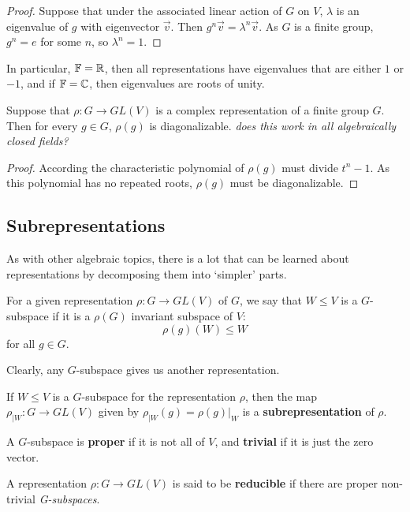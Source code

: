 \documentclass[a4paper]{article}
\begin{document}
\begin{proof}
    Suppose that under the associated linear action of $G$ on $V$, $\lambda$ is an eigenvalue of $g$ with eigenvector $\vec{v}$. Then $g^n\vec{v} = \lambda^n \vec{v}$. As $G$ is a finite group, $g^n = e$ for some $n$, so $\lambda^n = 1$.
\end{proof}
In particular, $\mathbb{F} = \mathbb{R}$, then all representations have eigenvalues that are either $1$ or $-1$, and if $\mathbb{F} = \mathbb{C}$, then eigenvalues are roots of unity.

\begin{cor}
    Suppose that $\rho : G \to GL(V)$ is a complex representation of a finite group $G$. Then for every $g \in G$, $\rho(g)$ is diagonalizable. \textit{does this work in all algebraically closed fields?} 
\end{cor} 

\begin{proof}
    According the characteristic polynomial of $\rho(g)$ must divide $t^n - 1$. As this polynomial has no repeated roots, $\rho(g)$ must be diagonalizable.
\end{proof}

\subsection{Subrepresentations}
As with other algebraic topics, there is a lot that can be learned about representations by decomposing them into `simpler' parts.

\begin{defi}[G-subspace]
    For a given representation $\rho: G \to GL(V)$ of $G$, we say that $W \leq V$ is a $G$-subspace if it is a $\rho(G)$ invariant subspace of $V$: $$\rho(g)(W) \leq W$$ for all $g \in G$.
\end{defi}

Clearly, any $G$-subspace gives us another representation.

\begin{defi}
    If $W \leq V$ is a $G$-subspace for the representation $\rho$, then the map $\rho_{|W}: G \to GL(V)$ given by $\rho_{|W}(g) = \rho(g)|_{W}$ is a \textbf{subrepresentation} of $\rho$.
\end{defi}

A $G$-subspace is \textbf{proper} if it is not all of $V$, and \textbf{trivial} if it is just the zero vector.

\begin{defi}[Reducible]
    A representation $\rho: G \to GL(V)$ is said to be \textbf{reducible} if there are proper non-trivial \textit{G-subspaces}.
\end{defi}
\end{document}

